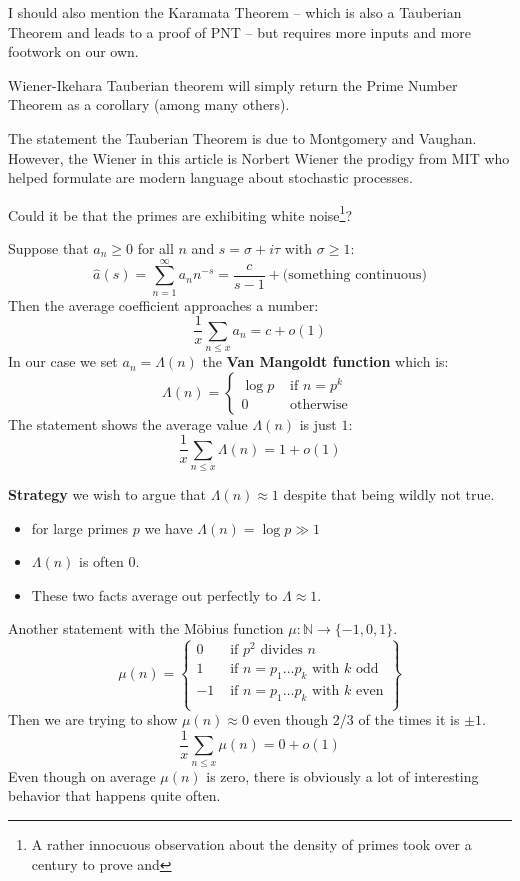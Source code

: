 \documentclass[12pt]{article}
\begin{document}
\newpage

\noindent I should also mention the Karamata Theorem -- which is also a Tauberian Theorem and leads to a proof of PNT -- but requires more inputs and more footwork on our own. \newline

\noindent Wiener-Ikehara Tauberian theorem will simply return the Prime Number Theorem as a corollary (among many others).\newline

\noindent The statement the Tauberian Theorem is due to Montgomery and Vaughan.  However, the Wiener in this article is Norbert Wiener the prodigy from MIT who helped formulate are modern language about stochastic processes. \newline

\noindent Could it be that the primes are exhibiting white noise\footnote{A rather innocuous observation about the  density of primes took over a century to prove and  }?

\newpage

\noindent Suppose that $a_n \geq 0$ for all $n$ and $s = \sigma+i\tau$ with $\sigma \geq 1$:
$$ \hat{a}(s) = \sum_{n=1}^\infty a_n n^{-s} = \frac{c}{s-1} + \big(\text{something continuous} \big) $$
Then the average coefficient approaches a number:
$$ \frac{1}{x}\sum_{n \leq x} a_n = c + o(1) $$
In our case we set $a_n = \Lambda(n)$ the \textbf{Van Mangoldt function} which is:
$$ \Lambda (n) = 
\left\{ \begin{array}{cl}
\log p & \text{ if }n = p^k \\
0 & \text{ otherwise }
\end{array}  \right. $$
The statement shows the average value $\Lambda(n)$ is just $1$:
$$ \frac{1}{x} \sum_{n \leq x} \Lambda(n) = 1 + o(1)$$


\newpage

\noindent \textbf{Strategy} we wish to argue that $\Lambda (n) \approx 1$ despite that being wildly not true. \begin{itemize}
\item for large primes $p$ we have $\Lambda(n) = \log p \gg 1$
\item $\Lambda(n)$ is often $0$.
\item These two facts average out perfectly to $\Lambda \approx 1$.
\end{itemize}
Another statement with the M\"{o}bius function $\mu: \mathbb{N} \to \{ -1,0, 1\}$.
$$ \mu(n) = \left\{
\begin{array}{rl}
0 & \text{ if }p^2 \text{ divides } n\\
1 & \text{ if }n = p_1 \dots p_k \text{ with }k\text{ odd}\\ 
-1 & \text{ if }n = p_1 \dots p_k \text{ with }k\text{ even}\\
 \end{array}
  \right\} $$
Then we are trying to show $\mu(n) \approx 0$ even though 2/3 of the times it is $\pm 1$.
$$ \frac{1}{x}\sum_{n \leq x} \mu(n) = 0 + o(1) $$
Even though on average $\mu(n)$ is zero, there is obviously a lot of interesting behavior that happens quite often. 
\end{document}
